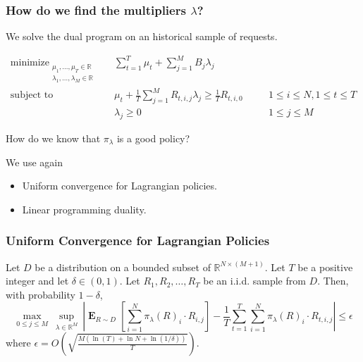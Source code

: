 \documentclass[usenames,dvipsnames]{beamer}
\DeclareMathOperator*{\Exp}{\mathbf{E}}
\DeclareMathOperator*{\minimize}{minimize}
\DeclareMathOperator*{\subjectto}{subject\ to}
\newcommand{\R}{\mathbb{R}}
\begin{document}
\begin{frame}
\frametitle{How do we find the multipliers $\lambda$?}

We solve the dual program on an historical sample of requests.

\begin{align*}
\minimize_{\substack{\mu_1, \dots, \mu_T \in \R \\ \lambda_1, \dots, \lambda_M \in \R}} \quad & \sum_{t=1}^T \mu_t + \sum_{j=1}^M B_j \lambda_j \\
\subjectto \quad & \mu_t + \frac{1}{T} \sum_{j=1}^M R_{t,i,j} \lambda_j  \ge \frac{1}{T} R_{t,i,0} && \quad 1 \le i \le N, 1 \le t \le T \\
& \lambda_j \ge 0 && \quad 1 \le j \le M
\end{align*}

How do we know that $\pi_\lambda$ is a good policy?

We use again
\begin{itemize}
\item Uniform convergence for Lagrangian policies.
\item Linear programming duality.
\end{itemize}
\end{frame}


\begin{frame}
\frametitle{Uniform Convergence for Lagrangian Policies}

\begin{theorem}
Let $D$ be a distribution on a bounded subset of $\R^{N \times (M+1)}$. Let $T$
be a positive integer and let $\delta \in (0,1)$. Let $R_1, R_2, \dots, R_T$ be
an i.i.d. sample from $D$. Then, with probability $1-\delta$,
$$
\max_{0 \le j \le M} \ \sup_{\lambda \in \R^M} \ \left| \Exp_{R \sim D} \left[ \sum_{i=1}^N \pi_\lambda(R)_i \cdot R_{i,j} \right] -  \frac{1}{T} \sum_{t=1}^T \sum_{i=1}^N \pi_\lambda(R)_i \cdot R_{t,i,j} \right| \le \epsilon
$$
where $\epsilon = O\left( \sqrt{\frac{M (\ln(T) + \ln N + \ln(1/\delta))}{T}} \right)$.
\end{theorem}

\end{frame}
\end{document}
